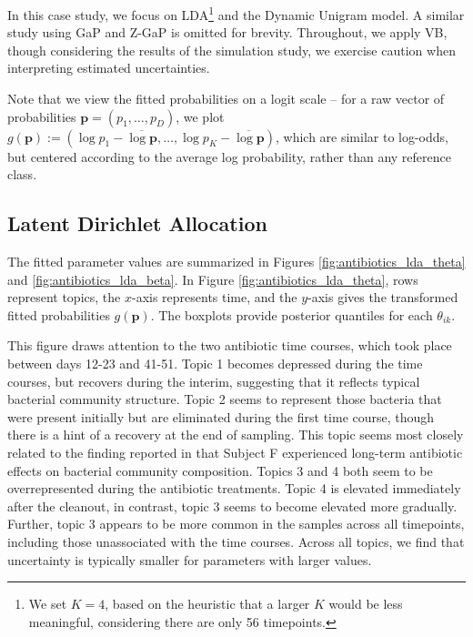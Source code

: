 \documentclass[oupdraft]{bio}
\begin{document}
In this case study, we focus on LDA\footnote{We set $K = 4$, based on the
  heuristic that a larger $K$ would be less meaningful, considering there are
  only 56 timepoints.} and the Dynamic Unigram model. A similar study using GaP
and Z-GaP is omitted for brevity. Throughout, we apply VB, though considering
the results of the simulation study, we exercise caution when interpreting
estimated uncertainties.

Note that we view the fitted probabilities on a logit scale -- for a raw vector
of probabilities $\mathbf{p} = \left(p_{1}, \dots, p_{D}\right)$, we plot
$g\left(\mathbf{p}\right) := \left(\log p_{1} - \overline{\log \mathbf{p}}, \dots,
\log p_{K} - \overline{\log \mathbf{p}}\right)$, which are similar to log-odds,
but centered according to the average log probability, rather than any reference
class.

\subsection{Latent Dirichlet Allocation}
\label{sec:antibiotics_lda}

The fitted parameter values are summarized in Figures
\ref{fig:antibiotics_lda_theta} and \ref{fig:antibiotics_lda_beta}.
In Figure \ref{fig:antibiotics_lda_theta}, rows represent topics, the $x$-axis
represents time, and the $y$-axis gives the transformed fitted probabilities
$g\left(\mathbf{p}\right)$. The boxplots provide posterior quantiles for each
$\theta_{ik}$.

This figure draws attention to the two antibiotic time courses, which took place
between days 12-23 and 41-51. Topic 1 becomes depressed during the time courses,
but recovers during the interim, suggesting that it reflects typical bacterial
community structure. Topic 2 seems to represent those bacteria that were present
initially but are eliminated during the first time course, though there is a
hint of a recovery at the end of sampling. This topic seems most closely related
to the finding reported in \citep{dethlefsen2011incomplete} that Subject F
experienced long-term antibiotic effects on bacterial community composition.
Topics 3 and 4 both seem to be overrepresented during the antibiotic treatments.
Topic 4 is elevated immediately after the cleanout, in contrast, topic 3 seems
to become elevated more gradually. Further, topic 3 appears to be more common in
the samples across all timepoints, including those unassociated with the time
courses. Across all topics, we find that uncertainty is typically smaller for
parameters with larger values.
\end{document}
